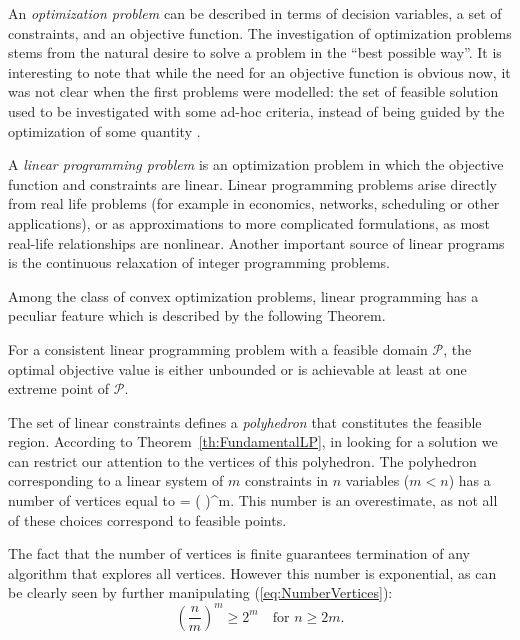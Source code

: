 An {\em optimization problem} can be described in terms of decision variables, 
a set of constraints, and an objective function. 
The investigation of optimization problems stems from the natural
desire to solve a problem in the ``best possible way''.
It is interesting to note that while the need for an objective function 
is obvious now, it was not clear when the first problems were modelled: the 
set of feasible solution used to be investigated with some ad-hoc criteria, 
instead of being guided by the optimization of some quantity 
\cite{Dantzig02}.

A {\em linear programming problem} is an optimization problem in which
the objective function and constraints are linear. 
Linear programming problems arise directly from real life problems
(for example in economics,
networks, scheduling or other applications), or as approximations to
more complicated formulations, as most real-life relationships are
nonlinear. Another important source of linear programs is the 
continuous relaxation of integer programming problems.

Among the class of convex optimization problems, linear programming
has a peculiar feature which is described by the following Theorem.

\begin{theorem}
\label{th:FundamentalLP}
For a consistent linear programming problem with a
feasible domain $\mathcal{P}$, the optimal objective value is either
unbounded or is achievable at least at one extreme point of $\mathcal{P}$.
\end{theorem}

The set of linear constraints defines a {\em polyhedron} that constitutes
the feasible region.
According to Theorem~\ref{th:FundamentalLP}, in looking for a solution 
we can restrict our attention to the vertices of this polyhedron.
The polyhedron corresponding to a linear system of $m$ constraints 
in $n$ variables ($m < n$) has a number of vertices equal to
\be \label{eq:NumberVertices}
 =  \ge \left(  \right)^m.
\ee
This number is an overestimate, as not all of these choices correspond
to feasible points.

The fact that the number of vertices is finite guarantees termination 
of any algorithm that explores all vertices.
However this number is exponential, as can be clearly seen by further
manipulating (\ref{eq:NumberVertices}):
\[
\left( \frac{n}{m} \right)^m \ge 2^m 
\quad \mbox{for } n \ge 2m.
\]

